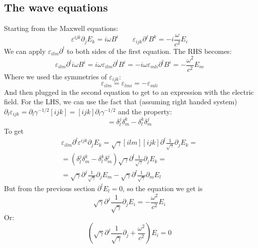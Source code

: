 \documentclass{article}
\begin{document}
\subsection{The wave equations}
Starting from the Maxwell equations:
\begin{equation}
\label{eq:maxwell}
    \varepsilon^{ijk}\partial_j E_k = i\omega B^i
    \qquad
    \varepsilon_{ijk}\partial^j B^k = -i\frac{\omega}{c^2} E_i
\end{equation}
We can apply $\varepsilon_{ilm}\partial^l$ to both sides of the first equation. The RHS becomes:
\begin{equation}
    \varepsilon_{ilm}\partial^l i\omega B^i = i\omega \varepsilon_{ilm}\partial^l B^i = - i\omega \varepsilon_{mli}\partial^l B^i = - \frac{\omega^2}{c^2} E_m
\end{equation}
Where we used the symmetries of $\varepsilon_{ijk}$:
\begin{equation}
    \varepsilon_{ilm} = \varepsilon_{lmi} = -\varepsilon_{mli}
\end{equation}
And then plugged in the second equation to get to an expression with the electric field. For the LHS, we can use the fact that (assuming right handed system) $\partial_l \varepsilon_{ijk} = \partial_l \gamma^{-1/2} [ijk] = [ijk]\partial_l \gamma^{-1/2}$ and the property:
\begin{equation}
    [ilm][ijk] = \delta_l^j\delta_m^k - \delta_l^k\delta_m^j
\end{equation}
To get
\begin{equation}
\begin{gathered}
    \varepsilon_{ilm}\partial^l \varepsilon^{ijk}\partial_j E_k = \sqrt{\gamma}[ilm][ijk] \partial^l \frac{1}{\sqrt{\gamma}}\partial_j E_k
    = \\ =
    (\delta_l^j\delta_m^k - \delta_l^k\delta_m^j)\sqrt{\gamma}\partial^l \frac{1}{\sqrt{\gamma}}\partial_j E_k
    = \\ =
    \sqrt{\gamma}\partial^j \frac{1}{\sqrt{\gamma}}\partial_j E_m -
    \sqrt{\gamma}\partial^l \frac{1}{\sqrt{\gamma}}\partial_m E_l
\end{gathered}
\end{equation}
But from the previous section $\partial^l E_l = 0$, so the equation we get is
\begin{equation}
    \sqrt{\gamma}\partial^j \frac{1}{\sqrt{\gamma}}\partial_j E_i  = - \frac{\omega^2}{c^2} E_i
\end{equation}
Or:
\begin{equation}
    \left(\sqrt{\gamma}\partial^j \frac{1}{\sqrt{\gamma}}\partial_j + \frac{\omega^2}{c^2}\right) E_i = 0
\end{equation}
\end{document}
